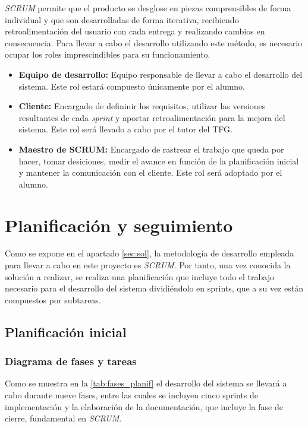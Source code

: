 \documentclass[12pt]{article}
\begin{document}
    \textit{SCRUM} permite que el producto se desglose en piezas comprensibles de forma individual y que son desarrolladas de forma iterativa, recibiendo retroalimentación del usuario con cada entrega y realizando cambios en consecuencia. Para llevar a cabo el desarrollo utilizando este método, es necesario ocupar los roles imprescindibles para su funcionamiento.

    \begin{itemize}
        \item \textbf{Equipo de desarrollo:} Equipo responsable de llevar a cabo el desarrollo del sistema. Este rol estará compuesto únicamente por el alumno.
        \item \textbf{Cliente:} Encargado de defininir los requisitos, utilizar las versiones resultantes de cada \textit{sprint} y aportar retroalimentación para la mejora del sistema. Este rol será llevado a cabo por el tutor del TFG.
        \item \textbf{Maestro de SCRUM:} Encargado de rastrear el trabajo que queda por hacer, tomar desiciones, medir el avance en función de la planificación inicial y mantener la comunicación con el cliente. Este rol será adoptado por el alumno.
    \end{itemize}

\section{Planificación y seguimiento} \label{sec:plan}
    Como se expone en el apartado \ref{sec:sol}, la metodología de desarrollo empleada para llevar a cabo en este proyecto es \textit{SCRUM}. Por tanto, una vez conocida la solución a realizar, se realiza una planificación que incluye todo el trabajo necesario para el desarrollo del sistema dividiéndolo en sprints, que a su vez están compuestos por subtareas.

    \subsection{Planificación inicial}
        \subsubsection{Diagrama de fases y tareas}
        Como se muestra en la \ref{tab:fases_planif} el desarrollo del sistema se llevará a cabo durante nueve fases, entre las cuales se incluyen cinco sprints de implementación y la elaboración de la documentación, que incluye la fase de cierre, fundamental en \textit{SCRUM}.
\end{document}
